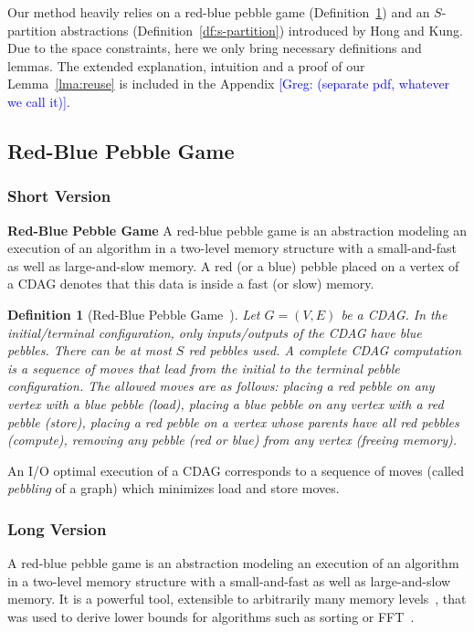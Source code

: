 \documentclass[sigplan,review,anonymous]{acmart}\settopmatter{printfolios=true,printccs=false,printacmref=false}
\newcommand\greg[1]{\textcolor{blue}{[Greg: #1]}}
\newtheorem{defn}{Definition}
\newcommand{\macb}[1]{\textbf{\textsf{#1}}}
\begin{document}
Our method heavily relies on a red-blue pebble game 
(Definition~\ref{df:redbluegame}) 
and an $S$-partition abstractions (Definition~\ref{df:s-partition}) introduced 
by Hong and Kung. Due to the space constraints, here we only bring necessary 
definitions and lemmas. The 
extended explanation, intuition and a proof of our Lemma~\ref{lma:reuse} is 
included in the Appendix \greg{(separate pdf, whatever we call it)}.

\subsection{Red-Blue Pebble Game}
\subsubsection{Short Version}
\macb{Red-Blue Pebble Game}
A red-blue pebble game is an abstraction modeling an execution of an algorithm 
in a two-level memory structure with a 
small-and-fast
as well as large-and-slow memory. A red (or a blue) pebble placed on a vertex 
of a CDAG denotes that this data is inside a fast (or slow) memory. 
 \begin{defn}[Red-Blue Pebble Game~\cite{redblue}] \label{df:redbluegame}
Let $G = (V,E)$ be a CDAG. 
In the initial/terminal configuration, only inputs/outputs of the CDAG have
blue pebbles.
%
There can be at most $S$ red pebbles used. A complete CDAG computation is a
sequence of moves that lead from the initial to the terminal pebble
configuration.
%
The allowed moves are as follows:  placing a red pebble on any vertex
with a blue pebble (load),  placing a blue pebble on any vertex with 
a red
pebble (store),  placing a red pebble on a vertex whose parents have 
all red
pebbles (compute),  removing any pebble (red or blue) from any vertex 
(freeing memory).
\end{defn}

An I/O optimal execution of a CDAG corresponds to a sequence of moves (called 
\emph{pebbling} of a graph) which minimizes load  and store 
 moves.


\subsubsection{Long Version}

A red-blue pebble game is an abstraction modeling an execution of an algorithm 
in a two-level memory structure with a 
small-and-fast
as well as large-and-slow memory.  It is a powerful tool, extensible to
arbitrarily many memory levels~\cite{redblueHierarchy}, that was used to derive
lower bounds for algorithms such as sorting or FFT~\cite{redblue}. 
%
\end{document}
